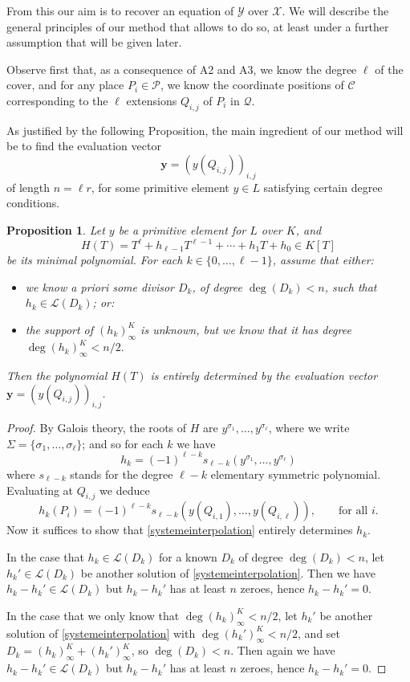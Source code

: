 \documentclass[10pt]{article}
\newtheorem{prop1}[thm]{Proposition}
\theoremstyle{definition}
\theoremstyle{definition}
\theoremstyle{definition}
\newcommand{\X}{\mathcal{X}}
\newcommand{\Y}{\mathcal{Y}}
\newcommand{\PR}{\mathcal{P}}
\newcommand{\QR}{\mathcal{Q}}
\begin{document}
From this our aim is to recover an equation of $\Y$ over $\X$.
We will describe the general principles of our method that allows to do so, at least under a further assumption that will be given later.

Observe first that, as a consequence of A2 and A3, we know the degree $\ell$ of the cover, and for any place $P_i \in \PR$, we know the coordinate positions of $\mathcal{C}$ corresponding to the $\ell$ extensions $Q_{i,j}$ of $P_i$ in $\QR$.

As justified by the following Proposition, the main ingredient of our method will be to find the evaluation vector
$$\mathbf{y} = (y(Q_{i,j}))_{i,j}$$
of length $n=\ell r$, for some primitive element $y\in L$ satisfying certain degree conditions.

\begin{prop1}\label{propositioninterpolation}
Let $y$ be a primitive element for $L$ over $K$, and
$$H(T)=T^\ell + h_{\ell-1}T^{\ell-1} + \cdots + h_1T + h_0 \in K[T]$$
be its minimal polynomial.
For each $k\in\{0,\dots,\ell-1\}$, assume that either:
\begin{itemize}
\item we know a priori some divisor $D_k$, of degree $\deg(D_k)<n$, such that $h_k\in\mathcal{L}(D_k)$; or:
\item the support of $(h_k)_\infty^K$ is unknown, but we know that it has degree $\deg(h_k)_\infty^K<n/2.$
\end{itemize}
Then the polynomial $H(T)$ is entirely determined by the evaluation vector $\mathbf{y} = (y(Q_{i,j}))_{i,j}$.
\end{prop1}
\begin{proof}
By Galois theory, the roots of $H$ are $y^{\sigma_1},\dots,y^{\sigma_\ell}$, where we write $\Sigma=\{\sigma_1,\dots,\sigma_\ell\}$; and so for each $k$ we have
$$h_k=(-1)^{\ell-k}s_{\ell-k}(y^{\sigma_1},\dots,y^{\sigma_\ell})$$
where $s_{\ell-k}$ stands for the degree $\ell-k$ elementary symmetric polynomial.
Evaluating at $Q_{i,j}$ we deduce
\begin{equation}\label{systemeinterpolation}
h_k(P_i)=(-1)^{\ell-k}s_{\ell-k}(y(Q_{i,1}),\dots,y(Q_{i,\ell})),\qquad\textrm{for all $i$}.
\end{equation}
Now it suffices to show that \eqref{systemeinterpolation} entirely determines $h_k$.

In the case that $h_k\in\mathcal{L}(D_k)$ for a known $D_k$ of degree $\deg(D_k)<n$, let $h_k'\in\mathcal{L}(D_k)$ be another solution of \eqref{systemeinterpolation}. Then we have $h_k-h_k'\in\mathcal{L}(D_k)$ but $h_k-h_k'$ has at least $n$ zeroes, hence $h_k-h_k'=0$.

In the case that we only know that $\deg(h_k)_\infty^K<n/2$, let $h_k'$ be another solution of \eqref{systemeinterpolation} with $\deg(h_k')_\infty^K<n/2$, and set $D_k=(h_k)_\infty^K+(h_k')_\infty^K$, so $\deg(D_k)<n$.
Then again we have $h_k-h_k'\in\mathcal{L}(D_k)$ but $h_k-h_k'$ has at least $n$ zeroes, hence $h_k-h_k'=0$.
\end{proof}
\end{document}
